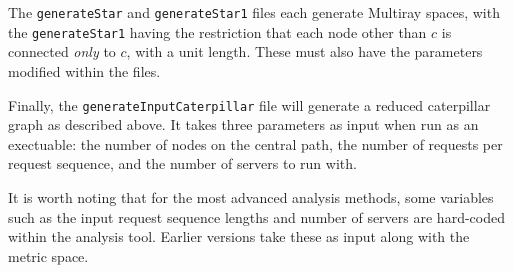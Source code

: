 The \texttt{generateStar} and \texttt{generateStar1} files each generate Multiray spaces, with the \texttt{generateStar1} having the restriction that each node other than $c$ is connected \textit{only} to $c$, with a unit length. These must also have the parameters modified within the files.

Finally, the \texttt{generateInputCaterpillar} file will generate a reduced caterpillar graph as described above. It takes three parameters as input when run as an exectuable: the number of nodes on the central path, the number of requests per request sequence, and the number of servers to run with. 

It is worth noting that for the most advanced analysis methods, some variables such as the input request sequence lengths and number of servers are hard-coded within the analysis tool. Earlier versions take these as input along with the metric space.
